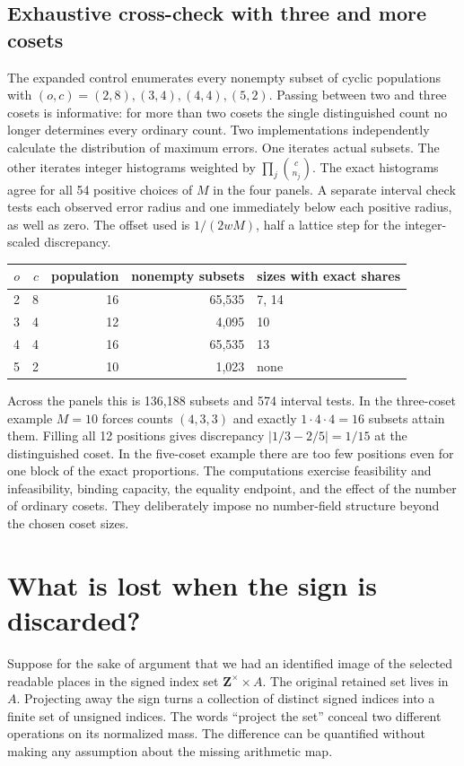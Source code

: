 \documentclass[12pt,letterpaper]{article}
\begin{document}
\subsection{Exhaustive cross-check with three and more cosets}
The expanded control enumerates every nonempty subset of cyclic populations with $(o,c)=(2,8),(3,4),(4,4),(5,2)$. Passing between two and three cosets is informative: for more than two cosets the single distinguished count no longer determines every ordinary count. Two implementations independently calculate the distribution of maximum errors. One iterates actual subsets. The other iterates integer histograms weighted by $\prod_j \binom{c}{n_j}$. The exact histograms agree for all 54 positive choices of $M$ in the four panels. A separate interval check tests each observed error radius and one immediately below each positive radius, as well as zero. The offset used is $1/(2wM)$, half a lattice step for the integer-scaled discrepancy.

\begin{center}\small
\begin{tabular}{@{}rrrrl@{}}\toprule
$o$ & $c$ & population & nonempty subsets & sizes with exact shares\\\midrule
2&8&16&65,535&7, 14\\
3&4&12&4,095&10\\
4&4&16&65,535&13\\
5&2&10&1,023&none\\\bottomrule
\end{tabular}\end{center}
Across the panels this is 136,188 subsets and 574 interval tests. In the three-coset example $M=10$ forces counts $(4,3,3)$ and exactly $1\cdot4\cdot4=16$ subsets attain them. Filling all 12 positions gives discrepancy $|1/3-2/5|=1/15$ at the distinguished coset. In the five-coset example there are too few positions even for one block of the exact proportions. The computations exercise feasibility and infeasibility, binding capacity, the equality endpoint, and the effect of the number of ordinary cosets. They deliberately impose no number-field structure beyond the chosen coset sizes.

\section{What is lost when the sign is discarded?}\label{sec:projection}
Suppose for the sake of argument that we had an identified image of the selected readable places in the signed index set $\mathbf Z^\times\times A$. The original retained set lives in $A$. Projecting away the sign turns a collection of distinct signed indices into a finite set of unsigned indices. The words “project the set” conceal two different operations on its normalized mass. The difference can be quantified without making any assumption about the missing arithmetic map.
\end{document}

